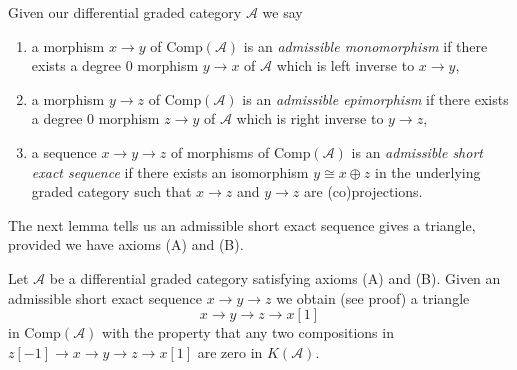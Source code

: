 \noindent
Given our differential graded category $\mathcal{A}$ we say
\begin{enumerate}
\item a morphism $x \to y$ of $\text{Comp}(\mathcal{A})$
is an {\it admissible monomorphism} if there exists a degree $0$ morphism
$y \to x$ of $\mathcal{A}$ which is left inverse to $x \to y$,
\item a morphism $y \to z$ of $\text{Comp}(\mathcal{A})$
is an {\it admissible epimorphism} if there exists a degree $0$ morphism
$z \to y$ of $\mathcal{A}$ which is right inverse to $y \to z$,
\item a sequence $x \to y \to z$ of morphisms of $\text{Comp}(\mathcal{A})$
is an {\it admissible short exact sequence} if there exists
an isomorphism $y \cong x \oplus z$ in the underlying graded category
such that $x \to z$ and $y \to z$ are (co)projections.
\end{enumerate}
The next lemma tells us an admissible short exact sequence gives a
triangle, provided we have axioms (A) and (B).

\begin{lemma}
\label{lemma-get-triangle}
Let $\mathcal{A}$ be a differential graded category satisfying
axioms (A) and (B). Given an admissible short exact sequence
$x \to y \to z$ we obtain (see proof) a triangle
$$
x \to y \to z \to x[1]
$$
in $\text{Comp}(\mathcal{A})$ with the property that any two compositions
in $z[-1] \to x \to y \to z \to x[1]$ are zero in $K(\mathcal{A})$.
\end{lemma}

